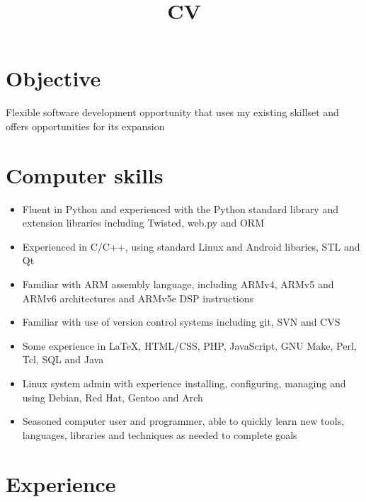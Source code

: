 \documentclass[11pt,a4paper,sans]{moderncv}
\title{CV}%
\begin{document}
%
\thispagestyle{empty}%
\makecvtitle
\section{Objective}
Flexible software development opportunity that uses my existing skillset and offers opportunities for its expansion
\section{Computer skills}
\begin{itemize}
    \item Fluent in Python and experienced with the Python standard library and extension libraries including Twisted, web.py and ORM
    \item Experienced in C/C++, using standard Linux and Android libaries, STL and Qt
    \item Familiar with ARM assembly language, including ARMv4, ARMv5 and ARMv6 architectures and ARMv5e DSP instructions
    \item Familiar with use of version control systems including git, SVN and CVS
    \item Some experience in \LaTeX, HTML/CSS, PHP, JavaScript, GNU Make, Perl, Tcl, SQL and Java
    \item Linux system admin with experience installing, configuring, managing and using Debian, Red Hat, Gentoo and Arch
    \item Seasoned computer user and programmer, able to quickly learn new tools, languages, libraries and techniques as needed to complete goals
\end{itemize}
\section{Experience}
\end{document}
